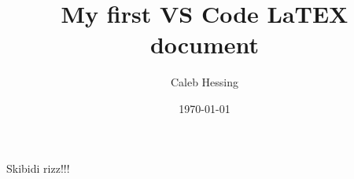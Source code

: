 \documentclass{article}
\title{My first VS Code LaTEX document}
\author{Caleb Hessing}
\date{\today}
\begin{document}
\maketitle

Skibidi rizz!!!
\end{document}

